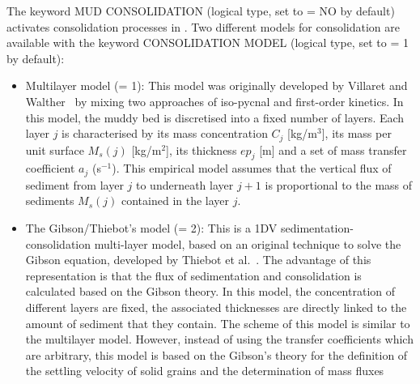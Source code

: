 The keyword {\ttfamily MUD CONSOLIDATION} (logical type, set to {\ttfamily = NO} by default) activates consolidation processes in \gaia{}. Two different models for consolidation are available with the keyword {\ttfamily CONSOLIDATION MODEL} (logical type, set to {\ttfamily = 1} by default):
\begin{itemize}
\item Multilayer model ({\ttfamily = 1}): This model was originally developed by Villaret and Walther~\cite{} by mixing two
approaches of iso-pycnal and first-order kinetics. In this model, the muddy bed is discretised into a fixed number of layers.
Each layer $j$ is characterised by its mass concentration $C_j$ [kg/m$^3$], its mass per unit surface $M_s(j)$
[kg/m$^2$], its thickness $ep_j$ [m] and a set of mass transfer coefficient $a_j$ (s$^{-1}$). This empirical model assumes that the vertical flux of
sediment from layer $j$ to underneath layer $j+1$ is proportional to the mass of sediments $M_s(j)$ contained in the layer $j$.

\item The Gibson/Thiebot's model ({\ttfamily = 2}): This is a 1DV sedimentation-consolidation multi-layer model, based on an original
technique to solve the Gibson equation, developed by Thiebot et al.~\cite{thiebot08}. The advantage of
this representation is that the flux of sedimentation and consolidation is calculated based on
the Gibson theory. In this model, the concentration of different layers are fixed, the associated thicknesses are directly
linked to the amount of sediment that they contain. The scheme of this model is similar to the multilayer model.
However, instead of using the transfer coefficients which are
arbitrary, this model is based on the Gibson's theory for the definition of the settling velocity
of solid grains and the determination of mass fluxes
\end{itemize}


